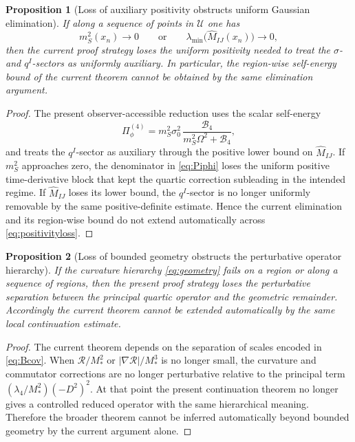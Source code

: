 \documentclass[11pt]{article}
\newtheorem{proposition}{Proposition}
\begin{document}
\begin{proposition}[Loss of auxiliary positivity obstructs uniform Gaussian elimination]
If along a sequence of points in \(\mathcal U\) one has
\begin{equation}
m_S^2(x_n)\to 0
\qquad\text{or}\qquad
\lambda_{\min}\!\bigl(\widehat M_{IJ}(x_n)\bigr)\to 0,
\label{eq:positivityloss}
\end{equation}
then the current proof strategy loses the uniform positivity needed to treat the \(\sigma\)- and \(q^I\)-sectors as uniformly auxiliary. In particular, the region-wise self-energy bound of the current theorem cannot be obtained by the same elimination argument.
\end{proposition}

\begin{proof}
The present observer-accessible reduction uses the scalar self-energy
\begin{equation}
\Pi_\phi^{(4)}
=
m_S^2\sigma_0^2\,
\frac{\mathcal B_4}{m_S^2\Omega^2+\mathcal B_4},
\label{eq:Piphi}
\end{equation}
and treats the \(q^I\)-sector as auxiliary through the positive lower bound on \(\widehat M_{IJ}\). If \(m_S^2\) approaches zero, the denominator in \eqref{eq:Piphi} loses the uniform positive time-derivative block that kept the quartic correction subleading in the intended regime. If \(\widehat M_{IJ}\) loses its lower bound, the \(q^I\)-sector is no longer uniformly removable by the same positive-definite estimate. Hence the current elimination and its region-wise bound do not extend automatically across \eqref{eq:positivityloss}.
\end{proof}

\begin{proposition}[Loss of bounded geometry obstructs the perturbative operator hierarchy]
If the curvature hierarchy \eqref{eq:geometry} fails on a region or along a sequence of regions, then the present proof strategy loses the perturbative separation between the principal quartic operator and the geometric remainder. Accordingly the current theorem cannot be extended automatically by the same local continuation estimate.
\end{proposition}

\begin{proof}
The current theorem depends on the separation of scales encoded in \eqref{eq:Bcov}. When \(\mathcal R/M_*^2\) or \(|\nabla\mathcal R|/M_*^3\) is no longer small, the curvature and commutator corrections are no longer perturbative relative to the principal term \((\lambda_4/M_*^2)(-D^2)^2\). At that point the present continuation theorem no longer gives a controlled reduced operator with the same hierarchical meaning. Therefore the broader theorem cannot be inferred automatically beyond bounded geometry by the current argument alone.
\end{proof}
\end{document}
